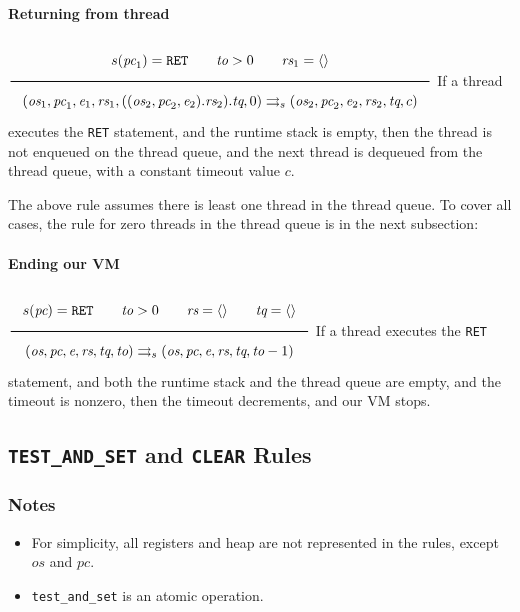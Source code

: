 \paragraph{Returning from thread}
\label{sec:org3702574}
\(\\\Rule{s(\textit{pc}_1) = \texttt{RET} \qquad \textit{to} > 0 \qquad \textit{rs}_1 = \langle \rangle}{(\textit{os}_1, \textit{pc}_1, \textit{e}_1, \textit{rs}_1, ((\textit{os}_2, \textit{pc}_2, \textit{e}_2).\textit{rs}_2).\textit{tq}, 0) \transition (\textit{os}_2, \textit{pc}_2, \textit{e}_2, \textit{rs}_2, \textit{tq}, c)}\\\)
If a thread executes the \texttt{RET} statement, and the runtime stack is empty, then the thread is not enqueued on the thread queue, and the next thread is dequeued from the thread queue, with a constant timeout value \(c\).

The above rule assumes there is least one thread in the thread queue. To cover all cases, the rule for zero threads in the thread queue is in the next subsection:

\paragraph{Ending our VM}
\label{sec:org2dae0a8}
\(\\\Rule{s(\textit{pc}) = \texttt{RET} \qquad \textit{to} > 0 \qquad \textit{rs} = \langle \rangle \qquad \textit{tq} = \langle \rangle}{(\textit{os}, \textit{pc}, \textit{e}, \textit{rs}, \textit{tq}, \textit{to}) \transition (\textit{os}, \textit{pc}, \textit{e}, \textit{rs}, \textit{tq}, \textit{to}-1)}\\\)
If a thread executes the \texttt{RET} statement, and both the runtime stack and the thread queue are empty, and the timeout is nonzero, then the timeout decrements, and our VM stops.

\subsection{\texttt{TEST\_AND\_SET} and \texttt{CLEAR} Rules}
\label{sec:org3306985}

\subsubsection{Notes}
\label{sec:orgcccda22}
\begin{itemize}
\item For simplicity, all registers and heap are not represented in the rules, except \(\textit{os}\) and \(\textit{pc}\).
\item \texttt{test\_and\_set} is an atomic operation.
\end{itemize}

